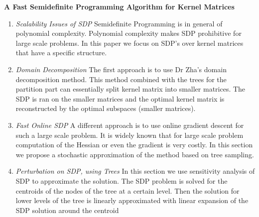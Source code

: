 \documentclass[times, 12pt,onecolumn]{article}
\begin{document}
\begin{center}
    \textbf{A Fast Semidefinite Programming Algorithm for Kernel Matrices}
\end{center}
\begin{enumerate}
  \item \textit{Scalability Issues of SDP} Semidefinite Programming  is in general of polynomial complexity. Polynomial complexity makes SDP prohibitive for large scale problems. In this paper we focus on SDP's over kernel matrices that have a specific structure.
  \item \textit{Domain Decomposition} The first approach is to use Dr Zha's domain decomposition method. This method combined with the trees for the partition part can essentially split kernel matrix into smaller matrices. The SDP is ran on the smaller matrices and the optimal kernel matrix is reconstructed by the optimal subspaces (smaller matrices).
  \item \textit{Fast Online SDP} A different approach is to use online gradient descent for such a large scale problem. It is widely known that for large scale problem computation of the Hessian or even the gradient is very costly. In this section we propose a stochastic approximation of the method based on tree sampling.
  \item \textit{Perturbation on SDP, using Trees} In this section we use sensitivity analysis of SDP to approximate the solution. The SDP problem is solved for the centroids of the nodes of the tree at a certain level. Then the solution for lower levels of the tree is linearly approximated  with linear expansion of the SDP solution around the centroid
\end{enumerate}

\newpage
\end{document}
